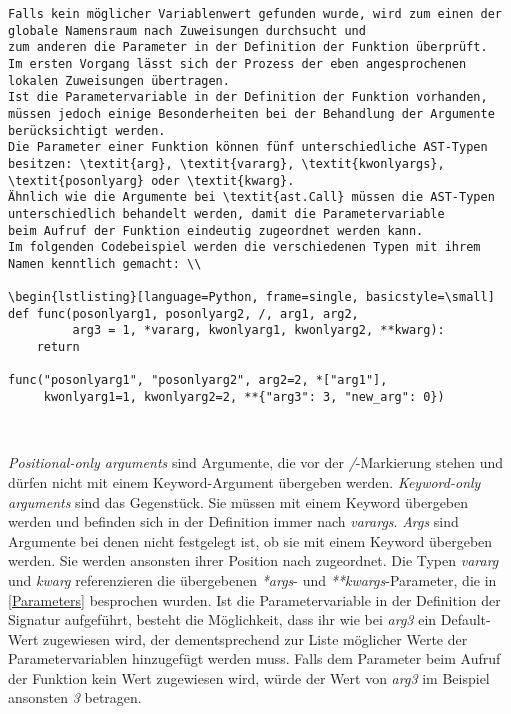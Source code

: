 \documentclass[german,bachelor]{swsLeipzig}
\begin{document}
\begin{lstlisting}[frame=single, basicstyle=\small]
Falls kein möglicher Variablenwert gefunden wurde, wird zum einen der globale Namensraum nach Zuweisungen durchsucht und
zum anderen die Parameter in der Definition der Funktion überprüft.
Im ersten Vorgang lässt sich der Prozess der eben angesprochenen lokalen Zuweisungen übertragen.
Ist die Parametervariable in der Definition der Funktion vorhanden, müssen jedoch einige Besonderheiten bei der Behandlung der Argumente
berücksichtigt werden.
Die Parameter einer Funktion können fünf unterschiedliche AST-Typen besitzen: \textit{arg}, \textit{vararg}, \textit{kwonlyargs},
\textit{posonlyarg} oder \textit{kwarg}.
Ähnlich wie die Argumente bei \textit{ast.Call} müssen die AST-Typen unterschiedlich behandelt werden, damit die Parametervariable
beim Aufruf der Funktion eindeutig zugeordnet werden kann.
Im folgenden Codebeispiel werden die verschiedenen Typen mit ihrem Namen kenntlich gemacht: \\

\begin{lstlisting}[language=Python, frame=single, basicstyle=\small]
def func(posonlyarg1, posonlyarg2, /, arg1, arg2,
         arg3 = 1, *vararg, kwonlyarg1, kwonlyarg2, **kwarg):
    return

func("posonlyarg1", "posonlyarg2", arg2=2, *["arg1"],
     kwonlyarg1=1, kwonlyarg2=2, **{"arg3": 3, "new_arg": 0})
\end{lstlisting}
\

\textit{Positional-only arguments} sind Argumente, die vor der \textit{/}-Markierung stehen und dürfen nicht mit einem
Keyword-Argument übergeben werden.
\textit{Keyword-only arguments} sind das Gegenstück.
Sie müssen mit einem Keyword übergeben werden und befinden sich in der Definition immer nach \textit{varargs}.
\textit{Args} sind Argumente bei denen nicht festgelegt ist, ob sie mit einem Keyword übergeben werden.
Sie werden ansonsten ihrer Position nach zugeordnet.
Die Typen \textit{vararg} und \textit{kwarg} referenzieren die übergebenen \textit{*args}- und \textit{**kwargs}-Parameter,
die in \ref{Parameters} besprochen wurden.
Ist die Parametervariable in der Definition der Signatur aufgeführt, besteht die Möglichkeit, dass ihr wie bei \textit{arg3} ein Default-Wert
zugewiesen wird, der dementsprechend zur Liste möglicher Werte der Parametervariablen hinzugefügt werden muss.
Falls dem Parameter beim Aufruf der Funktion kein Wert zugewiesen wird, würde der Wert von \textit{arg3} im Beispiel ansonsten
\textit{3} betragen.\\
\end{document}
